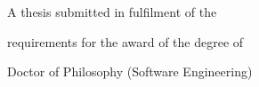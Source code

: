 \startstandardmakeup
\startalignment[center]
    \blank[2.5cm]

    \blank[5cm]

    \blank[5cm]

    {A thesis submitted in fulfilment of the \par
    requirements for the award of the degree of \par
    Doctor of Philosophy (Software Engineering)}

    \blank[4cm]


    \blank[2.5cm]
\stopalignment
\stopstandardmakeup
